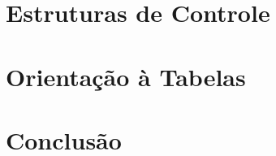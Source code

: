 \documentclass[
12pt, %
openright, %
oneside, %
a4paper, %
english, %
brazil, %
]{abntex2}
\begin{document}
\chapter{Estruturas de Controle}
\chapter{Orientação à Tabelas}



\chapter{Conclusão}
\cite{Sebesta}
\cite{Lua_Org}


\postextual













\end{document}
